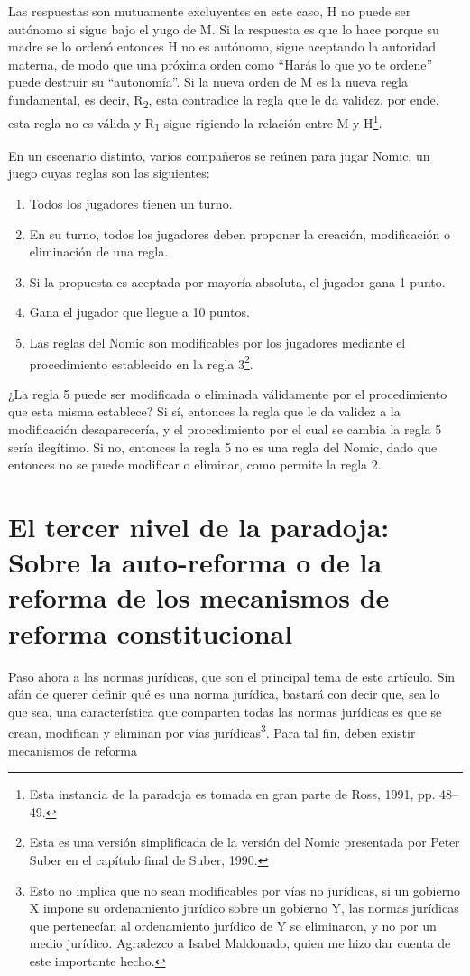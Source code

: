 \documentclass[]{book}
\begin{document}
Las respuestas son mutuamente excluyentes en este caso, H no puede ser
autónomo si sigue bajo el yugo de M. Si la respuesta es que lo hace
porque su madre se lo ordenó entonces H no es autónomo, sigue aceptando
la autoridad materna, de modo que una próxima orden como ``Harás lo que
yo te ordene'' puede destruir su ``autonomía''. Si la nueva orden de M
es la nueva regla fundamental, es decir, R\textsubscript{2}, esta
contradice la regla que le da validez, por ende, esta regla no es
válida y R\textsubscript{1} sigue rigiendo la relación entre M y
H\footnote{Esta instancia de la paradoja es tomada en gran parte de
  Ross, 1991, pp. 48--49.}.

En un escenario distinto, varios compañeros se reúnen para jugar Nomic,
un juego cuyas reglas son las siguientes:

\begin{enumerate}
\def\labelenumi{\arabic{enumi}.}
\item
  \protect\hypertarget{_Hlk508135530}{}{}Todos los jugadores tienen un
  turno.
\item
  En su turno, todos los jugadores deben proponer la creación,
  modificación o eliminación de una regla.
\item
  Si la propuesta es aceptada por mayoría absoluta, el jugador gana 1
  punto.
\item
  Gana el jugador que llegue a 10 puntos.
\item
  Las reglas del Nomic son modificables por los jugadores mediante el
  procedimiento establecido en la regla 3\footnote{Esta es una versión
    simplificada de la versión del Nomic presentada por Peter Suber en
    el capítulo final de Suber, 1990.}.
\end{enumerate}

¿La regla 5 puede ser modificada o eliminada válidamente por el
procedimiento que esta misma establece? Si sí, entonces la regla que le
da validez a la modificación desaparecería, y el procedimiento por el
cual se cambia la regla 5 sería ilegítimo. Si no, entonces la regla 5 no
es una regla del Nomic, dado que entonces no se puede modificar o
eliminar, como permite la regla 2.

\section*{El tercer nivel de la paradoja: Sobre la auto-reforma o de la reforma de los mecanismos de reforma constitucional}

Paso ahora a las normas jurídicas, que son el principal tema de este
artículo. Sin afán de querer definir qué es una norma jurídica, bastará
con decir que, sea lo que sea, una característica que comparten todas
las normas jurídicas es que se crean, modifican y eliminan por vías
jurídicas\footnote{Esto no implica que no sean modificables por vías no
  jurídicas, si un gobierno X impone su ordenamiento jurídico sobre un gobierno Y, las  normas jurídicas que pertenecían al ordenamiento jurídico de Y se eliminaron, y no por un  medio jurídico. Agradezco a Isabel Maldonado, quien me hizo dar cuenta
  de este importante hecho.}. Para tal fin, deben existir mecanismos de
reforma
\end{document}
